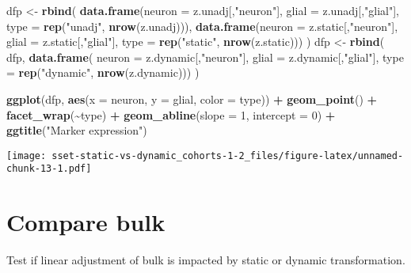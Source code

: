 \documentclass[
]{article}
\newenvironment{Shaded}{\begin{snugshade}}{\end{snugshade}}
\newcommand{\AttributeTok}[1]{\textcolor[rgb]{0.13,0.29,0.53}{#1}}
\newcommand{\DecValTok}[1]{\textcolor[rgb]{0.00,0.00,0.81}{#1}}
\newcommand{\FunctionTok}[1]{\textcolor[rgb]{0.13,0.29,0.53}{\textbf{#1}}}
\newcommand{\NormalTok}[1]{#1}
\newcommand{\OtherTok}[1]{\textcolor[rgb]{0.56,0.35,0.01}{#1}}
\newcommand{\SpecialCharTok}[1]{\textcolor[rgb]{0.81,0.36,0.00}{\textbf{#1}}}
\newcommand{\StringTok}[1]{\textcolor[rgb]{0.31,0.60,0.02}{#1}}
\begin{document}
\begin{Shaded}
\begin{Highlighting}[]
\NormalTok{dfp }\OtherTok{\textless{}{-}} \FunctionTok{rbind}\NormalTok{(}
  \FunctionTok{data.frame}\NormalTok{(}\AttributeTok{neuron =}\NormalTok{ z.unadj[,}\StringTok{"neuron"}\NormalTok{], }\AttributeTok{glial =}\NormalTok{ z.unadj[,}\StringTok{"glial"}\NormalTok{], }\AttributeTok{type =} \FunctionTok{rep}\NormalTok{(}\StringTok{"unadj"}\NormalTok{, }\FunctionTok{nrow}\NormalTok{(z.unadj))),}
  \FunctionTok{data.frame}\NormalTok{(}\AttributeTok{neuron =}\NormalTok{ z.static[,}\StringTok{"neuron"}\NormalTok{], }\AttributeTok{glial =}\NormalTok{ z.static[,}\StringTok{"glial"}\NormalTok{], }\AttributeTok{type =} \FunctionTok{rep}\NormalTok{(}\StringTok{"static"}\NormalTok{, }\FunctionTok{nrow}\NormalTok{(z.static)))}
\NormalTok{)}
\NormalTok{dfp }\OtherTok{\textless{}{-}} \FunctionTok{rbind}\NormalTok{(}
\NormalTok{  dfp,}
  \FunctionTok{data.frame}\NormalTok{(}
    \AttributeTok{neuron =}\NormalTok{ z.dynamic[,}\StringTok{"neuron"}\NormalTok{], }\AttributeTok{glial =}\NormalTok{ z.dynamic[,}\StringTok{"glial"}\NormalTok{], }
    \AttributeTok{type =} \FunctionTok{rep}\NormalTok{(}\StringTok{"dynamic"}\NormalTok{, }\FunctionTok{nrow}\NormalTok{(z.dynamic)))}
\NormalTok{)}

\FunctionTok{ggplot}\NormalTok{(dfp, }\FunctionTok{aes}\NormalTok{(}\AttributeTok{x =}\NormalTok{ neuron, }\AttributeTok{y =}\NormalTok{ glial, }\AttributeTok{color =}\NormalTok{ type)) }\SpecialCharTok{+} 
  \FunctionTok{geom\_point}\NormalTok{() }\SpecialCharTok{+} \FunctionTok{facet\_wrap}\NormalTok{(}\SpecialCharTok{\textasciitilde{}}\NormalTok{type) }\SpecialCharTok{+}
  \FunctionTok{geom\_abline}\NormalTok{(}\AttributeTok{slope =} \DecValTok{1}\NormalTok{, }\AttributeTok{intercept =} \DecValTok{0}\NormalTok{) }\SpecialCharTok{+}
  \FunctionTok{ggtitle}\NormalTok{(}\StringTok{"Marker expression"}\NormalTok{)}
\end{Highlighting}
\end{Shaded}

\texttt{[image: sset-static-vs-dynamic\_cohorts-1-2\_files/figure-latex/unnamed-chunk-13-1.pdf]}

\hypertarget{compare-bulk}{%
\section{Compare bulk}\label{compare-bulk}}

Test if linear adjustment of bulk is impacted by static or dynamic
transformation.
\end{document}
